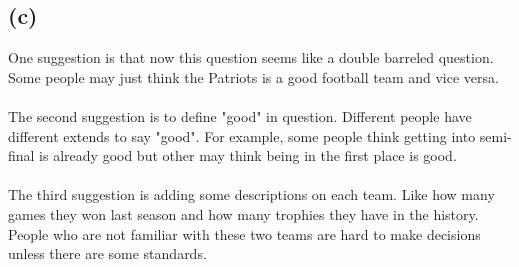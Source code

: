 \documentclass{article}
\begin{document}
\subsection*{(c)}
One suggestion is that now this question seems like a double barreled question. Some people may just think the Patriots is a good football team and vice versa.\\
\\
The second suggestion is to define "good" in question. Different people have different extends to say "good". For example, some people think getting into semi-final is already good but other may think being in the first place is good.\\
\\
The third suggestion is adding some descriptions on each team. Like how many games they won last season and how many trophies they have in the history. People who are not familiar with these two teams are hard to make decisions unless there are some standards.\\
\end{document}
